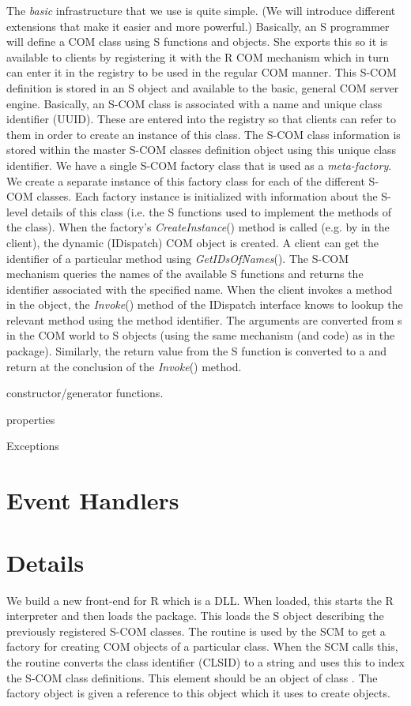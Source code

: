 \documentclass{article}
\def\COMMethod#1{\textsl{#1}()}
\begin{document}
The \textit{basic} infrastructure that we use is quite simple.  (We
will introduce different extensions that make it easier and more
powerful.)  Basically, an S programmer will define a COM class using S
functions and objects.  She exports this so it is available to clients
by registering it with the R COM mechanism which in turn can enter it
in the registry to be used in the regular COM manner.  This S-COM
definition is stored in an S object and available to the basic,
general COM server engine.  Basically, an S-COM class is associated
with a name and unique class identifier (UUID).  These are entered
into the registry so that clients can refer to them in order to create
an instance of this class.  The S-COM class information is stored
within the master S-COM classes definition object using this unique
class identifier.  We have a single S-COM factory class that is used
as a \textit{meta-factory}.  We create a separate instance of this
factory class for each of the different S-COM classes.  Each factory
instance is initialized with information about the S-level details of
this class (i.e. the S functions used to implement the methods of the
class).  When the factory's \COMMethod{CreateInstance} method is
called (e.g. by  in the client), the
dynamic (IDispatch) COM object is created.  A client can get the
identifier of a particular method using \COMMethod{GetIDsOfNames}.
The S-COM mechanism queries the names of the available S functions and
returns the identifier associated with the specified name.  When the
client invokes a method in the object, the \COMMethod{Invoke} method
of the IDispatch interface knows to lookup the relevant method using
the method identifier.  The arguments are converted from
s in the COM world to S objects (using the same
mechanism (and code) as in the  package).
Similarly, the return value from the S function is converted to a
 and return at the conclusion of the
\COMMethod{Invoke} method.




constructor/generator functions.

properties

Exceptions

\section{Event Handlers}


\section{Details}
We build a new front-end for R which is a DLL. When loaded, this
starts the R interpreter and then loads the 
package.  This loads the S object describing the previously registered
S-COM classes.  The routine  is used by
the SCM to get a factory for creating COM objects of a particular
class. When the SCM calls this, the routine converts the class
identifier (CLSID) to a string and uses this to index the S-COM class
definitions.  This element should be an object of class
.  The factory object is given a reference to
this object which it uses to create objects.
\end{document}
